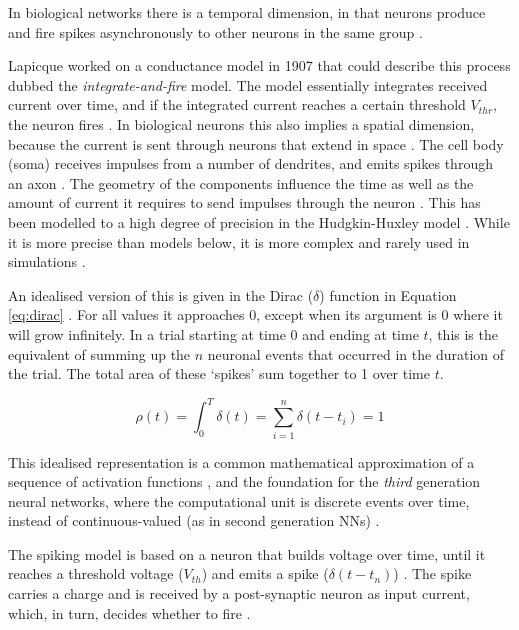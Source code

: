 \documentclass[report.tex]{subfiles}
\begin{document}
In biological networks there is a temporal dimension, in that neurons
produce and fire spikes asynchronously to other neurons in the same
group \cite{Eliasmith2004}.

Lapicque worked on a conductance model in 1907 that could describe this
process dubbed the \textit{integrate-and-fire} 
model.
The model essentially integrates received current over time, and
if the integrated current reaches a certain threshold $V_{thr}$, the neuron
fires \cite{Dayan2001, Eliasmith2004}.
In biological neurons this also implies a spatial dimension, because the
current is sent through 	neurons that extend in space \cite{Dayan2001}.
The cell body (soma) receives impulses from a number
of dendrites, and emits spikes through an 
axon \cite{Dayan2001}.
The geometry of the components influence the time as well as the amount of current
it requires to send impulses through the neuron \cite{Eliasmith2004}.
This has been modelled to a high degree of precision in the 
Hudgkin-Huxley model \cite{Dayan2001}.
While it is more precise than models below, it is
more complex \cite[p. 195]{Dayan2001} and rarely used in simulations
\cite{Albada2018, Dayan2001, Eliasmith2015}.

An idealised version of this is given in the Dirac ($\delta$) function 
in Equation \ref{eq:dirac} \cite[p. 404]{Dayan2001}.
For all values it approaches 0, except when its argument is
0 where it will grow infinitely.
In a trial starting at time $0$ and ending at time $t$, this
is the equivalent of summing up the $n$ neuronal events that occurred in 
the duration of the trial.
The total area of these `spikes' sum together to 1 over time $t$. 

\begin{equation} \label{eq:dirac}
  \rho(t) = \int_0^T \delta(t) = \sum_{i=1}^n \delta(t - t_i) = 1
\end{equation}

This idealised representation is a common mathematical approximation of
a sequence of activation functions \cite{Dayan2001, Eliasmith2004},
and the foundation for the \textit{third} generation
neural networks, where the computational unit is discrete events over time,
instead of continuous-valued (as in second generation \glspl{NN})
\cite{Maass1997}.

The spiking model is based on a neuron that builds voltage over time, until
it reaches a threshold voltage ($V_{th}$) and emits a spike
\mbox{($\delta(t-t_n)$)}
\cite{Dayan2001, Eliasmith2004}.
The spike carries a charge and is received by a post-synaptic neuron as
input current, which, in turn, decides whether to fire \cite{Dayan2001}.
\end{document}
